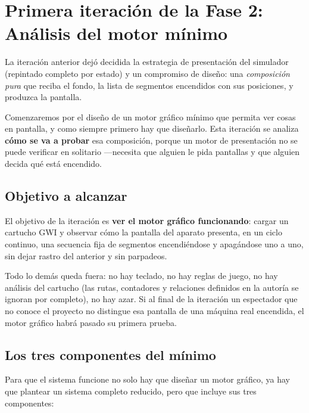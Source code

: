 \section{Primera iteración de la Fase 2: Análisis del motor mínimo}
\label{sec:AnalisisMotorMinimo}

La iteración anterior dejó decidida la estrategia de presentación del simulador (repintado completo por estado) y un compromiso de diseño: una \emph{composición pura} que reciba el fondo, la lista de segmentos encendidos con sus posiciones, y produzca la pantalla. 

Comenzaremos por el diseño de un motor gráfico mínimo que permita ver cosas en pantalla, y como siempre primero hay que diseñarlo. Esta iteración se analiza \textbf{cómo se va a probar} esa composición, porque un motor de presentación no se puede verificar en solitario ---necesita que alguien le pida pantallas y que alguien decida qué está encendido.


\subsection{Objetivo a alcanzar}
\label{subsec:ObjetivoF2I2}

El objetivo de la iteración es \textbf{ver el motor gráfico funcionando}: cargar un cartucho GWI y observar cómo la pantalla del aparato presenta, en un ciclo continuo, una secuencia fija de segmentos encendiéndose y apagándose uno a uno, sin dejar rastro del anterior y sin parpadeos.

Todo lo demás queda fuera: no hay teclado, no hay reglas de juego, no hay análisis del cartucho (las rutas, contadores y relaciones definidos en la autoría se ignoran por completo), no hay azar. Si al final de la iteración un espectador que no conoce el proyecto no distingue esa pantalla de una máquina real encendida, el motor gráfico habrá pasado su primera prueba.

\subsection{Los tres componentes del mínimo}
\label{subsec:TresComponentes}

Para que el sistema funcione no solo hay que diseñar un motor gráfico, ya hay que plantear un sistema completo reducido, pero que incluye sus tres componentes:


